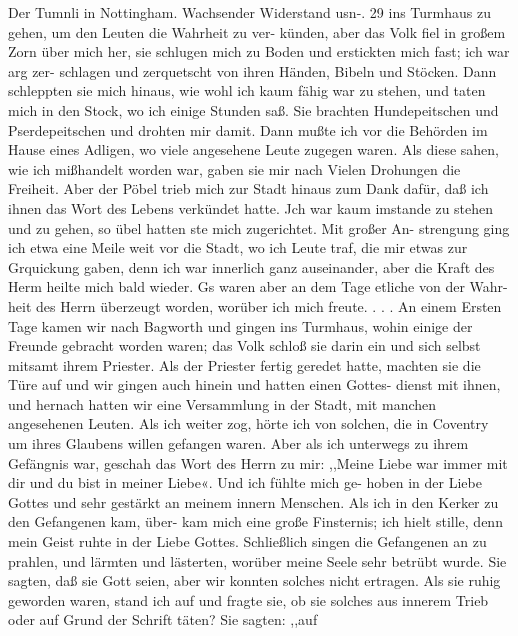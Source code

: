 Der Tumnli in Nottingham. Wachsender Widerstand usn-. 29
ins Turmhaus zu gehen, um den Leuten die Wahrheit zu ver-
künden, aber das Volk fiel in großem Zorn über mich her, sie
schlugen mich zu Boden und erstickten mich fast; ich war arg zer-
schlagen und zerquetscht von ihren Händen, Bibeln und Stöcken.
Dann schleppten sie mich hinaus, wie wohl ich kaum fähig war
zu stehen, und taten mich in den Stock, wo ich einige Stunden
saß. Sie brachten Hundepeitschen und Pserdepeitschen und drohten
mir damit. Dann mußte ich vor die Behörden im Hause eines
Adligen, wo viele angesehene Leute zugegen waren. Als diese
sahen, wie ich mißhandelt worden war, gaben sie mir nach
Vielen Drohungen die Freiheit. Aber der Pöbel trieb mich
zur Stadt hinaus zum Dank dafür, daß ich ihnen das Wort des
Lebens verkündet hatte. Jch war kaum imstande zu stehen und
zu gehen, so übel hatten ste mich zugerichtet. Mit großer An-
strengung ging ich etwa eine Meile weit vor die Stadt, wo ich
Leute traf, die mir etwas zur Grquickung gaben, denn ich war
innerlich ganz auseinander, aber die Kraft des Herm heilte mich
bald wieder. Gs waren aber an dem Tage etliche von der Wahr-
heit des Herrn überzeugt worden, worüber ich mich freute. . . .
An einem Ersten Tage kamen wir nach Bagworth und gingen
ins Turmhaus, wohin einige der Freunde gebracht worden waren;
das Volk schloß sie darin ein und sich selbst mitsamt ihrem
Priester. Als der Priester fertig geredet hatte, machten sie die
Türe auf und wir gingen auch hinein und hatten einen Gottes-
dienst mit ihnen, und hernach hatten wir eine Versammlung in
der Stadt, mit manchen angesehenen Leuten. Als ich weiter zog,
hörte ich von solchen, die in Coventry um ihres Glaubens willen
gefangen waren. Aber als ich unterwegs zu ihrem Gefängnis war,
geschah das Wort des Herrn zu mir: ,,Meine Liebe war immer
mit dir und du bist in meiner Liebe«. Und ich fühlte mich ge-
hoben in der Liebe Gottes und sehr gestärkt an meinem innern
Menschen. Als ich in den Kerker zu den Gefangenen kam, über-
kam mich eine große Finsternis; ich hielt stille, denn mein Geist
ruhte in der Liebe Gottes. Schließlich singen die Gefangenen
an zu prahlen, und lärmten und lästerten, worüber meine
Seele sehr betrübt wurde. Sie sagten, daß sie Gott seien, aber
wir konnten solches nicht ertragen. Als sie ruhig geworden
waren, stand ich auf und fragte sie, ob sie solches aus innerem
Trieb oder auf Grund der Schrift täten? Sie sagten: ,,auf


